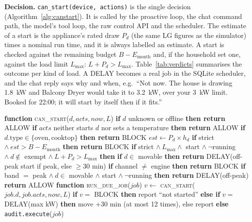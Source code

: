 \documentclass[conference]{IEEEtran}
\begin{document}
\textbf{Decision.} \texttt{can\_start(device, actions)} is the single decision (Algorithm~\ref{alg:canstart}). It is called by the proactive loop, the chat command path, the model's tool loop, the raw control API and the scheduler. The estimate of a start is the appliance's rated draw $P_d$ (the same LG figures as the simulator) times a nominal run time, and it is always labelled an estimate. A start is checked against the remaining budget $B - E_{\text{month}}$ and, if the household set one, against the load limit $L_{\max}$: $L + P_d > L_{\max}$. Table~\ref{tab:verdicts} summarises the outcome per kind of load. A DELAY becomes a real job in the SQLite scheduler, and the chat reply says why and when, e.g.\ ``Not now. The house is drawing 1.8~kW and Balcony Dryer would take it to 3.2~kW, over your 3~kW limit. Booked for 22:00; it will start by itself then if it fits.''

\begin{algorithm}[!t]
\caption{Energy Gate: \textsc{can\_start} and the Due-Job Re-Check}
\label{alg:canstart}
\begin{algorithmic}[1]
\STATE \textbf{function} \textsc{can\_start}($d, acts, now, L$)
\STATE \quad \textbf{if} $d$ unknown or offline \textbf{then return} ALLOW 
\STATE \quad \textbf{if} $acts$ neither starts $d$ nor sets a temperature \textbf{then return} ALLOW
\STATE \quad \textbf{if} $d.\text{type} \in \{\text{oven}, \text{cooktop}\}$ \textbf{then return} BLOCK
\STATE \quad $est \leftarrow P_d \times h_d$ 
\STATE \quad \textbf{if} strict $\land\ est > B - E_{\text{month}}$ \textbf{then return} BLOCK
\STATE \quad \textbf{if} strict $\land\ L_{\max} \land$ start $\land\ \lnot$running $\land\ d \notin$ exempt $\land\ L + P_d > L_{\max}$ \textbf{then}
\STATE \quad \quad \textbf{if} $d \in$ movable \textbf{then return} DELAY(off-peak start if peak, else $\geq$30 min)
\STATE \quad \quad \textbf{if} channel $\neq$ engine \textbf{then return} BLOCK 
\STATE \quad \textbf{if} band $=$ peak $\land\ d \in$ movable $\land$ start $\land\ \lnot$running \textbf{then return} DELAY(off-peak)
\STATE \quad \textbf{return} ALLOW
\STATE
\STATE \textbf{function} \textsc{run\_due\_job}($job$) 
\STATE \quad $v \leftarrow$ \textsc{can\_start}($job.d, job.acts, now, L$) 
\STATE \quad \textbf{if} $v =$ BLOCK \textbf{then} report ``not started''
\STATE \quad \textbf{else if} $v =$ DELAY(max kW) \textbf{then} move $+30$ min (at most 12 times), else report
\STATE \quad \textbf{else} \texttt{audit.execute}($job$) 
\end{algorithmic}
\end{algorithm}
\end{document}

